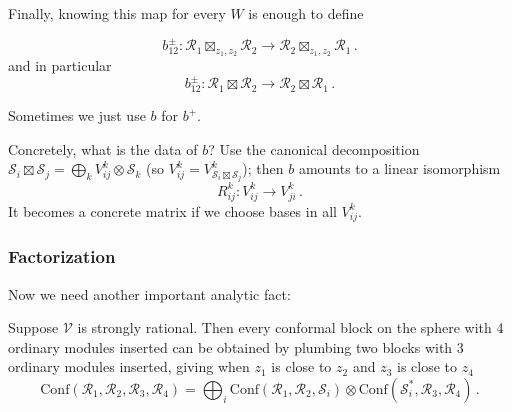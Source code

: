 \documentclass[12pt,letterpaper,reqno]{amsart}
\numberwithin{equation}{section}
\newcommand{\cS}{\ensuremath{\mathcal S}}
\newcommand{\vertex}{\mathcal{V}}
\newcommand{\vrep}{\mathcal{R}}
\newcommand{\Conf}{\textrm{Conf}}
\newcommand{\ti}[1]{\textit{#1}}
\DeclareMathOperator{\ev}{ev}
\DeclareMathOperator{\coev}{coev}
\DeclareRobustCommand{\fixme}[1]{\leavevmode{\color{orange}[#1]}}
\begin{document}
Finally, knowing this map for every $W$ is enough to define 

\begin{equation}
 b_{12}^\pm:  \vrep_1 \boxtimes_{z_1,z_2} \vrep_2 \to \vrep_2 \boxtimes_{z_1,z_2} \vrep_1 \, .
\end{equation}
and in particular
\begin{equation}
 b_{12}^\pm:  \vrep_1 \boxtimes \vrep_2 \to \vrep_2 \boxtimes \vrep_1 \, .
\end{equation}

Sometimes we just use $b$ for $b^+$.

Concretely, what is the data of $b$?
Use the canonical decomposition 
$\cS_i \boxtimes \cS_j = \bigoplus_k V_{ij}^k \otimes \cS_k$ (so
$V_{ij}^k = V^k_{\cS_i \boxtimes \cS_j}$); then
$b$ amounts to a linear isomorphism
\begin{equation}
  R_{ij}^k: V_{ij}^k \to V_{ji}^k \, .
\end{equation}
It becomes a concrete matrix if we choose bases in all $V_{ij}^k$.




\subsubsection{Factorization}

Now we need another important analytic fact:

\begin{prop} \label{prop:factorization-strongly-rational}
Suppose $\vertex$ is strongly rational. Then
every conformal block on the sphere
with 4 ordinary modules inserted can be obtained by plumbing
two blocks with 3 ordinary modules inserted, giving 
when $z_1$ is close to $z_2$ and $z_3$ is close to $z_4$
\fixme{draw a picture here}
\begin{equation} \label{eq:factorization-four-punctures}
  \Conf(\vrep_1, \vrep_2, \vrep_3, \vrep_4) = \bigoplus_i \Conf(\vrep_1, \vrep_2, \cS_i) \otimes \Conf(\cS^*_i, \vrep_3, \vrep_4) \, .
\end{equation}
\end{prop}
\end{document}

